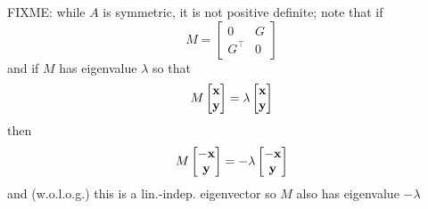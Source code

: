 FIXME: while $A$ is symmetric, it is not positive definite; note that if
    $$M = \begin{bmatrix} 0 & G \\ G^\top & 0 \end{bmatrix}$$
and if $M$ has eigenvalue $\lambda$ so that
    $$M \begin{bmatrix} \mathbf{x} \\ \mathbf{y} \end{bmatrix} = \lambda \begin{bmatrix} \mathbf{x} \\ \mathbf{y} \end{bmatrix}$$
then
    $$M \begin{bmatrix} -\mathbf{x} \\ \mathbf{y} \end{bmatrix} = - \lambda \begin{bmatrix} -\mathbf{x} \\ \mathbf{y} \end{bmatrix}$$
and (w.o.l.o.g.) this is a lin.-indep. eigenvector so $M$ also has eigenvalue $-\lambda$




